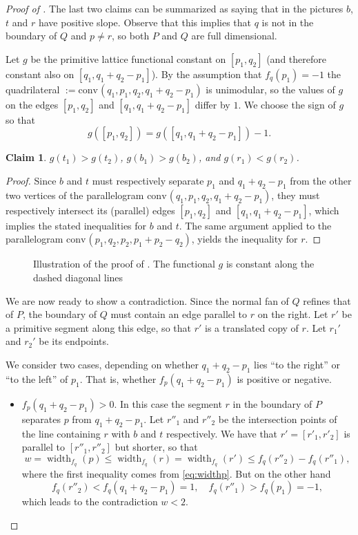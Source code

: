 \documentclass{amsart}
\theoremstyle{plain}
\newtheorem{claim}[theorem]{Claim}
\theoremstyle{definition}
\newcommand{\width}{\operatorname{width}}
\newcommand{\conv}{\ensuremath{\mathrm{conv}}\hspace{1pt}}
\begin{document}
\begin{proof}[Proof of ]
The last two claims can be summarized as saying that in the pictures $b$, $t$ and $r$ have positive slope. Observe that this implies that $q$ is not in the boundary of $Q$ and $p \neq r$, so both $P$ and $Q$ are full dimensional.


Let $g$ be the primitive lattice functional constant on $[p_1, q_2]$ (and therefore constant also on $[q_1, q_1+q_2-p_1]$). By the assumption that $f_q(p_1)=-1$ the quadrilateral $:=\conv(q_1, p_1, q_2, q_1+q_2-p_1)$
 is unimodular, so  the values of $g$ on the edges $[p_1, q_2]$ and $[q_1, q_1+q_2-p_1]$ differ by $1$. We choose the sign of $g$ so that 
\[
g([p_1, q_2])= g( [q_1, q_1+q_2-p_1]) -1. 
\]

\begin{claim}
\label{claim:g}
$g(t_1) > g(t_2)$, $g(b_1) > g(b_2)$, and $g(r_1) < g(r_2)$.
\end{claim}

\begin{proof}
Since $b$ and $t$ must respectively separate $p_1$ and $q_1+q_2-p_1$ from the other two vertices of the parallelogram $\conv(q_1, p_1, q_2, q_1+q_2-p_1)$, they must respectively intersect its (parallel) edges $[p_1, q_2]$ and $[q_1, q_1+q_2-p_1]$, which implies the stated inequalities for $b$ and $t$.
The same argument  applied to the parallelogram  $\conv(p_1, q_2, p_2, p_1+p_2-q_2)$, yields the inequality for $r$.
\end{proof}

\begin{figure}[htb]
\scalebox{.75}{}
\caption{Illustration of the proof of . The functional $g$ is constant along the dashed diagonal lines}
\label{fig:claim4}
\end{figure}

We are now ready to show a contradiction. Since the normal fan of $Q$ refines that of $P$, the boundary of $Q$ must contain an edge parallel to $r$ on the right. Let $r'$ be a primitive segment along this edge, so that $r'$ is a translated copy of $r$.
 Let $r_1'$ and $r_2'$ be its endpoints. 

We consider two cases, depending on whether $q_1+q_2-p_1$ lies ``to the right'' or ``to the left'' of $p_1$. That is, whether $f_p(q_1+q_2-p_1)$ is positive or negative. %
 
\begin{itemize}
\item \underline{$f_p(q_1+q_2-p_1)> 0$}. In this case the segment $r$ in the boundary of $P$ separates $p$ from  $q_1+q_2-p_1$.
Let $r''_1$ and $r''_2$ be the intersection points of the line containing $r$ with $b$ and $t$ respectively. We have that
$r'=[r'_1,r'_2]$ is parallel to $[r''_1,r''_2]$ but shorter, so that
\[
w= \width_{f_q}(p) \le \width_{f_q}(r) = \width_{f_q}(r') \le  f_q(r''_2) -f_q(r''_1), 
\]
where the first inequality comes from \eqref{eq:widthp}.
But on the other hand
\[
f_q(r''_2) < f_q(q_1+q_2-p_1) = 1, \quad f_q(r''_1) > f_q(p_1) =-1,
\]
which leads to the contradiction $w<2$.



\end{itemize}
\end{proof}
\end{document}
